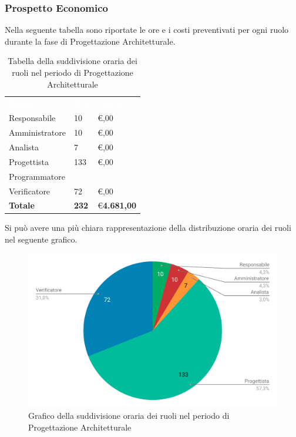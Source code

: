 \subsubsection{Prospetto Economico}
Nella seguente tabella sono riportate le ore e i costi preventivati per ogni ruolo durante la fase di Progettazione Architetturale.


\begin{table}[H]	
	\begin{center}
	    \begin{tabular}{C{4cm}C{1cm}C{3,5cm}}
			\textcolor{white}{\textbf{Ruolo}} & \textcolor{white}{\textbf{Ore}} & \textcolor{white}{\textbf{Costo}}
			\\
			Responsabile & 10 & \euro {},00 \\
			Amministratore & 10 & \euro {},00 \\
			Analista & 7 & \euro {},00 \\
			Progettista & 133 & \euro {},00 \\
			Programmatore &  & \space  \\
			Verificatore & 72 & \euro {},00 \\
			\textbf{Totale} & \textbf{232} & \euro \space  \textbf{4.681,00} \\
		\end{tabular}
	    \caption{Tabella della suddivisione oraria dei ruoli nel periodo di Progettazione Architetturale} \label{tab:tabellaRuoliProgettazione Architetturale} 
	\end{center}
\end{table}


Si può avere una più chiara rappresentazione della distribuzione oraria dei ruoli nel seguente grafico.

\begin{figure}[H]
	\includegraphics[width=1\linewidth]{Preventivo/grafici/PA2.pdf}
	\caption{Grafico della suddivisione oraria dei ruoli nel periodo di Progettazione Architetturale}
\end{figure}

